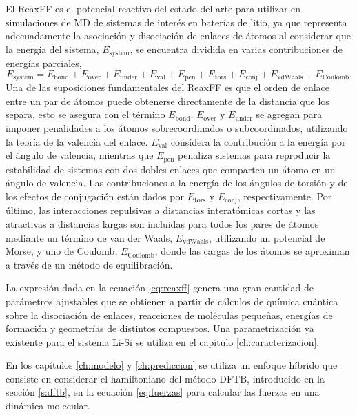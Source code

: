 El ReaxFF \cite{reaxff} es el potencial reactivo del estado del arte para 
utilizar en simulaciones de MD de sistemas de interés en baterías de litio, ya
que representa adecuadamente la asociación y disociación de enlaces de átomos al 
considerar que la energía del sistema, $E_{\text{system}}$, se encuentra dividida
en varias contribuciones de energías parciales,
\begin{equation}\label{eq:reaxff}
    E_{\text{system}} = E_{\text{bond}} + E_{\text{over}} + E_{\text{under}} + E_{\text{val}} + E_{\text{pen}} + E_{\text{tors}} + E_{\text{conj}} + E_{\text{vdWaals}} + E_{\text{Coulomb}}.
\end{equation}
Una de las suposiciones fundamentales del ReaxFF es que el orden de enlace entre
un par de átomos puede obtenerse directamente de la distancia que los separa, 
esto se asegura con el término $E_{\text{bond}}$. $E_{\text{over}}$ y 
$E_{\text{under}}$ se agregan para imponer penalidades a los átomos 
sobrecoordinados o subcoordinados, utilizando la teoría de la valencia del enlace.
$E_{\text{val}}$ considera la contribución a la energía por el ángulo de valencia, 
mientras que $E_{\text{pen}}$ penaliza sistemas para reproducir la estabilidad de 
sistemas con dos dobles enlaces que comparten un átomo en un ángulo de valencia.
Las contribuciones a la energía de los ángulos de torsión y de los efectos de 
conjugación están dados por $E_{\text{tors}}$ y $E_{\text{conj}}$, 
respectivamente. Por último, las interacciones repulsivas a distancias 
interatómicas cortas y las atractivas a distancias largas son incluidas para 
todos los pares de átomos mediante un término de van der Waals, 
$E_{\text{vdWaals}}$, utilizando un potencial de Morse, y uno de Coulomb, 
$E_{\text{Coulomb}}$, donde las cargas de los átomos se aproximan a través de 
un método de equilibración.

La expresión dada en la ecuación \ref{eq:reaxff} genera una gran cantidad de 
parámetros ajustables que se obtienen a partir de cálculos de química cuántica
sobre la disociación de enlaces, reacciones de moléculas pequeñas, energías de 
formación y geometrías de distintos compuestos. Una parametrización ya existente
para el sistema Li-Si \cite{fan2013} se utiliza en el capítulo 
\ref{ch:caracterizacion}.

En los capítulos \ref{ch:modelo} y \ref{ch:prediccion} se utiliza un enfoque 
híbrido que consiste en considerar el hamiltoniano del método DFTB, introducido 
en la sección \ref{s:dftb}, en la ecuación \ref{eq:fuerzas} para calcular las 
fuerzas en una dinámica molecular.

